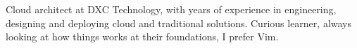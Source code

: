 
\begin{cvparagraph}

Cloud architect at DXC Technology, with years of experience in engineering, designing and deploying cloud and traditional solutions. Curious learner, always looking at how things works at their foundations, I prefer Vim.
\end{cvparagraph}
